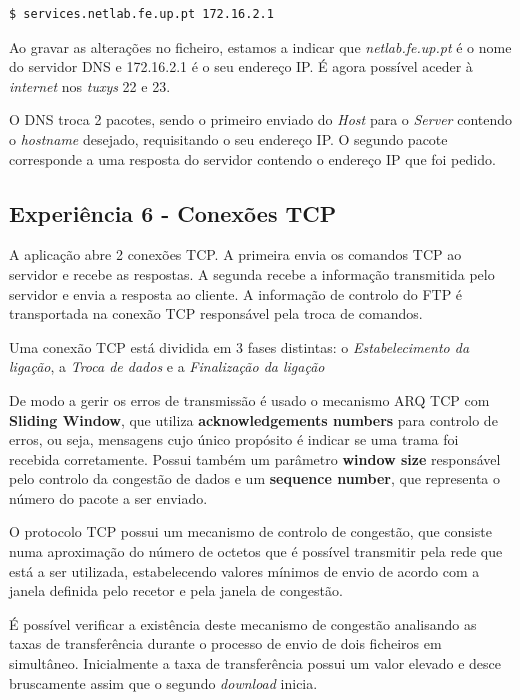 \documentclass[11pt]{article}
\begin{document}
\begin{lstlisting}[language=bash]
    $ services.netlab.fe.up.pt 172.16.2.1
\end{lstlisting}

Ao gravar as alterações no ficheiro, estamos a indicar que \textit{netlab.fe.up.pt} é o nome do servidor DNS e 172.16.2.1 é o seu endereço IP. É agora possível aceder à \textit{internet} nos \textit{tuxys} 22 e 23.

O DNS troca 2 pacotes, sendo o primeiro enviado do \textit{Host} para o \textit{Server} contendo o \textit{hostname} desejado, requisitando o seu endereço IP. O segundo pacote corresponde a uma resposta do servidor contendo o endereço IP que foi pedido.

\subsection{Experiência 6 - Conexões TCP}

A aplicação abre 2 conexões TCP. A primeira envia os comandos TCP ao servidor e recebe as respostas. A segunda recebe a informação transmitida pelo servidor e envia a resposta ao cliente. A informação de controlo do FTP é transportada na conexão TCP responsável pela troca de comandos.

Uma conexão TCP está dividida em 3 fases distintas: o \emph{Estabelecimento da ligação}, a \emph{Troca de dados} e a \emph{Finalização da ligação}


De modo a gerir os erros de transmissão é usado o mecanismo ARQ TCP com \textbf{Sliding Window}, que utiliza \textbf{acknowledgements numbers} para controlo de erros, ou seja, mensagens cujo único propósito é indicar se uma trama foi recebida corretamente. Possui também um parâmetro \textbf{window size} responsável pelo controlo da congestão de dados e um \textbf{sequence number}, que representa o número do pacote a ser enviado.

O protocolo TCP possui um mecanismo de controlo de congestão, que consiste numa aproximação do número de octetos que é possível transmitir pela rede que está a ser utilizada, estabelecendo valores mínimos de envio de acordo com a janela definida pelo recetor e pela janela de congestão.

É possível verificar a existência deste mecanismo de congestão analisando as taxas de transferência durante o processo de envio de dois ficheiros em simultâneo. Inicialmente a taxa de transferência possui um valor elevado e desce bruscamente assim que o segundo \textit{download} inicia.
\end{document}
